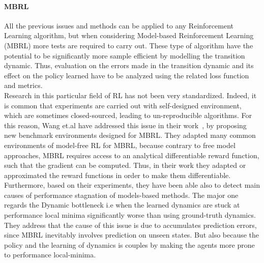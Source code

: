 \documentclass{article}
\begin{document}
\paragraph{MBRL}
All the previous issues and methods can be applied to any Reinforcement Learning algorithm, but when considering Model-based Reinforcement Learning (MBRL) more tests are required to carry out. These type of algorithm have the potential to be significantly more sample efficient by modelling the transition dynamic. Thus, evaluation on the errors made in the transition dynamic and its effect on the policy learned have to be analyzed using the related loss function and metrics.\\
Research in this particular field of RL has not been very standardized. Indeed, it is common that experiments are carried out with self-designed environment, which are sometimes closed-sourced, leading to un-reproducible algorithms. For this reason,  Wang et.al have addressed this issue in their work~\cite{MBRLBenchmarking}, by proposing new benchmark environments designed for MBRL. They adapted many common environments of model-free RL for MBRL, because contrary to free model approaches, MBRL requires access to an analytical differentiable reward function, such that the gradient can be computed. Thus, in their work they adapted or approximated the reward functions in order to make them differentiable.\\ Furthermore, based on their experiments, they have been able also to detect main causes of performance stagnation of models-based methods. The major one regards the Dynamic bottleneck i.e when the learned dynamics are stuck at performance local minima significantly worse than using ground-truth dynamics. They address that the cause of this issue is due to accumulates prediction errors, since MBRL inevitably involves prediction on unseen states. But also because the policy and the learning of dynamics is couples by making the agents more prone to performance local-minima.
\end{document}
